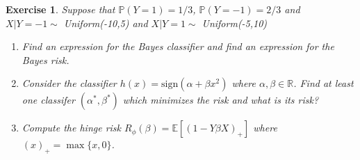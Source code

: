 \documentclass[12pt]{article}
\theoremstyle{colon}
\newtheorem{exercise}{Exercise}
\begin{document}
\begin{exercise}
  Suppose that $\mathbb{P}(Y=1) = 1/3$, $\mathbb{P}(Y=-1) = 2/3$ and $X|Y = -1 \sim $ Uniform(-10,5) and $X|Y = 1 \sim $ Uniform(-5,10)
  \begin{enumerate}[label=\alph*)]
    \item Find an expression for the Bayes classifier and find an expression for the Bayes risk.
    \item Consider the classifier $h(x) = \text{sign}(\alpha + \beta x^2)$ where $\alpha, \beta \in \mathbb{R}$. Find at least one classifer $(\alpha^*, \beta^*)$ which minimizes the risk and what is its risk?
    \item Compute the hinge risk $R_\phi (\beta) = \mathbb{E}[(1-Y \beta X)_+]$ where \\ $(x)_+ = \max \{x, 0\}$.
  \end{enumerate}
\end{exercise}
\end{document}
